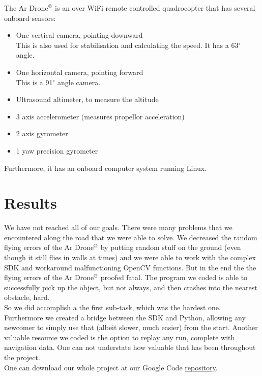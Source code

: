 \documentclass[a4paper,10pt]{article}
\newcommand{\Ardrone}{Ar Drone$^{\copyright}$ }
\begin{document}
The \Ardrone is an over WiFi remote controlled quadrocopter that has several onboard sensors:
\begin{itemize}
	\item One vertical camera, pointing downward \\ This is also used for stabilisation and calculating the speed. It has a 63$^{\circ}$ angle.
	\item One horizontal camera, pointing forward \\ This is a 91$^{\circ}$ angle camera.
	\item Ultrasound altimeter, to measure the altitude
    \item 3 axis accelerometer (measures propellor acceleration)
    \item 2 axis gyrometer 
    \item 1 yaw precision gyrometer
\end{itemize}
Furthermore, it has an onboard computer system running Linux. 





\section{Results}
We have not reached all of our goals. There were many problems that we encountered along the road that we were able to solve. We decreased the random flying errors
of the \Ardrone by putting random stuff on the ground (even though it still flies in walls at times) and we were able to work with the complex SDK and workaround
malfunctioning OpenCV functions. But in the end the the flying errors of the \Ardrone proofed fatal. The program we coded is able to successfully pick up the object,
but not always, and then crashes into the nearest obstacle, hard. \\

So we did accomplish a the first sub-task, which was the hardest one. Furthermore we created a bridge between the SDK and Python, allowing any newcomer to simply use 
that (albeit slower, much easier) from the start. Another valuable resource we coded is the option to replay any run, complete with navigation data. One can not understate
how valuable that has been throughout the project. \\

One can download our whole project at our Google Code \href{http://code.google.com/p/uvhar/}{repository}.
\end{document}

